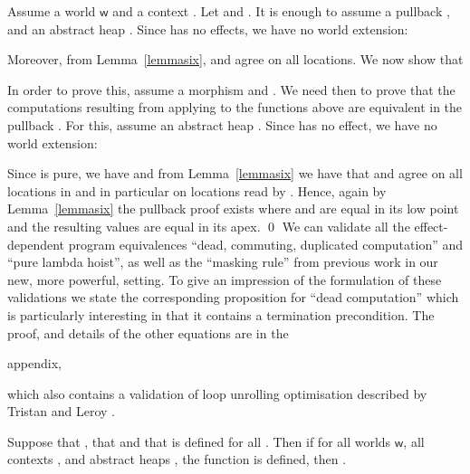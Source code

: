\documentclass[orivec]{llncs}
\newif\iffull\fullfalse
\newif\ifapp\apptrue
\renewenvironment{proof}{\vspace{-1mm} \noindent {\bf Proof}\quad}{\qed}
\newcommand\w{\ensuremath{\mathsf{w}}\xspace}
\begin{document}
\begin{proof}
Assume a world \w and a context .
Let  and 
. 
It is enough to assume a pullback 
, and an abstract heap . Since  has no effects, we have no world extension:

Moreover, from Lemma~\ref{lemmasix},  and  agree on
all locations. We now show that 

In order to prove this, assume a morphism  and . We need then to prove that the computations resulting from 
applying  to the functions above are equivalent in the pullback
. For this, assume an abstract heap . Since  has no effect, we have no world extension:

Since  is pure, we have  and from
Lemma~\ref{lemmasix} we have that  and  agree on all
locations in  and in particular on locations read by . Hence, 
again by Lemma~\ref{lemmasix} the pullback proof exists where 
and 
 are equal in its low point and the resulting values are equal
in its apex.
\end{proof}
\else
We can validate all the effect-dependent program equivalences ``dead,
commuting, duplicated computation'' and ``pure lambda hoist'', as well
as the ``masking rule'' from previous work \cite{DBLP:conf/aplas/BentonKHB06} in our new, more powerful,
setting.
To give an impression of the
formulation of these validations we state the corresponding proposition for
``dead computation'' which is particularly interesting in that it contains
a termination precondition. The proof, and details of the other
equations are in the 
\ifapp
appendix,
\else
long version, 
\fi
which also 
contains a validation of loop unrolling optimisation 
described by Tristan and Leroy \cite{tristan10popl}. 
 \begin{proposition}\label{dead}
Suppose that
,
that  and that  is defined for all
. 
Then if for all worlds \w, all contexts , and abstract heaps ,
the function  is defined, 
then .
\end{proposition}
 \fi
\iffull
\end{document}
